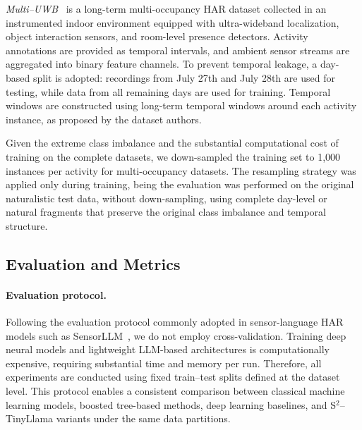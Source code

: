 \documentclass[preprint,12pt]{elsarticle}
\begin{document}
\emph{Multi--UWB}~\cite{anguita2025multi} is a long-term multi-occupancy HAR dataset collected in an instrumented indoor environment equipped with ultra-wideband localization, object interaction sensors, and room-level presence detectors. Activity annotations are provided as temporal intervals, and ambient sensor streams are aggregated into binary feature channels. To prevent temporal leakage, a day-based split is adopted: recordings from July 27th and July 28th are used for testing, while data from all remaining days are used for training. Temporal windows are constructed using long-term temporal windows around each activity instance, as proposed by the dataset authors.


Given the extreme class imbalance and the substantial computational cost of training on the complete datasets, we down-sampled the training set to 1{,}000 instances per activity for multi-occupancy datasets. The resampling strategy was applied only during training, being the evaluation was performed on the original naturalistic test data, without down-sampling, using complete day-level or natural fragments that preserve the original class imbalance and temporal structure.

\subsection{Evaluation and Metrics}
\label{subsec:evaluation_metrics}

\paragraph{Evaluation protocol.}
Following the evaluation protocol commonly adopted in sensor-language HAR models such as SensorLLM~\cite{li2025sensorllm}, we do not employ cross-validation. Training deep neural models and lightweight LLM-based architectures is computationally expensive, requiring substantial time and memory per run. Therefore, all experiments are conducted using fixed train--test splits defined at the dataset level. This protocol enables a consistent comparison between classical machine learning models, boosted tree-based methods, deep learning baselines, and S$^2$--TinyLlama variants under the same data partitions.
\end{document}
